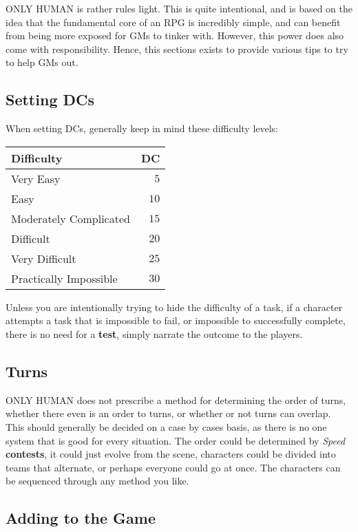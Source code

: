\documentclass[11pt]{article}
\begin{document}
\begin{multicols}{3}
  ONLY HUMAN is rather rules light. This is quite intentional, and is based on the idea that the fundamental core of an RPG is incredibly simple, and can benefit from being more exposed for GMs to tinker with. However, this power does also come with responsibility. Hence, this sections exists to provide various tips to try to help GMs out.

  \subsection*{Setting DCs}

  When setting DCs, generally keep in mind these difficulty levels:

  \begin{center}
    \begin{tabular}{ lr }
      Difficulty & DC \\
      \hline
      Very Easy & $5$ \\
      Easy & $10$ \\
      Moderately Complicated & $15$ \\
      Difficult & $20$ \\
      Very Difficult & $25$ \\
      Practically Impossible & $30$
    \end{tabular}
  \end{center}

  Unless you are intentionally trying to hide the difficulty of a task, if a character attempts a task that is impossible to fail, or impossible to successfully complete, there is no need for a \textbf{test}, simply narrate the outcome to the players.

  \subsection*{Turns}

  ONLY HUMAN does not prescribe a method for determining the order of turns, whether there even is an order to turns, or whether or not turns can overlap. This should generally be decided on a case by cases basis, as there is no one system that is good for every situation. The order could be determined by \textit{Speed} \textbf{contests}, it could just evolve from the scene, characters could be divided into teams that alternate, or perhaps everyone could go at once. The characters can be sequenced through any method you like.

  \subsection*{Adding to the Game}


\end{multicols}
\end{document}
